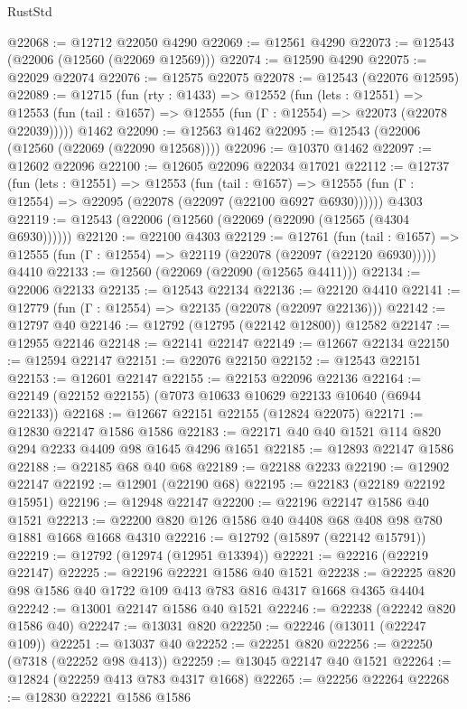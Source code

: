 \begin{lexlean}{RustStd}
\begin{coremodule}
@22068 := @12712 @22050 @4290
@22069 := @12561 @4290
@22073 := @12543 (@22006 (@12560 (@22069 @12569)))
@22074 := @12590 @4290
@22075 := @22029 @22074
@22076 := @12575 @22075
@22078 := @12543 (@22076 @12595)
@22089 := @12715
    (fun (rty : @1433) =>
    @12552
      (fun (lets : @12551) =>
      @12553 (fun (tail : @1657) => @12555 (fun (Γ : @12554) => @22073 (@22078 @22039)))))
    @1462
@22090 := @12563 @1462
@22095 := @12543 (@22006 (@12560 (@22069 (@22090 @12568))))
@22096 := @10370 @1462
@22097 := @12602 @22096
@22100 := @12605 @22096 @22034 @17021
@22112 := @12737
    (fun (lets : @12551) =>
    @12553
      (fun (tail : @1657) =>
      @12555 (fun (Γ : @12554) => @22095 (@22078 (@22097 (@22100 @6927 @6930))))))
    @4303
@22119 := @12543 (@22006 (@12560 (@22069 (@22090 (@12565 (@4304 @6930))))))
@22120 := @22100 @4303
@22129 := @12761
    (fun (tail : @1657) => @12555 (fun (Γ : @12554) => @22119 (@22078 (@22097 (@22120 @6930)))))
    @4410
@22133 := @12560 (@22069 (@22090 (@12565 @4411)))
@22134 := @22006 @22133
@22135 := @12543 @22134
@22136 := @22120 @4410
@22141 := @12779 (fun (Γ : @12554) => @22135 (@22078 (@22097 @22136)))
@22142 := @12797 @40
@22146 := @12792 (@12795 (@22142 @12800)) @12582
@22147 := @12955 @22146
@22148 := @22141 @22147
@22149 := @12667 @22134
@22150 := @12594 @22147
@22151 := @22076 @22150
@22152 := @12543 @22151
@22153 := @12601 @22147
@22155 := @22153 @22096 @22136
@22164 := @22149 (@22152 @22155) (@7073 @10633 @10629 @22133 @10640 (@6944 @22133))
@22168 := @12667 @22151 @22155 (@12824 @22075)
@22171 := @12830 @22147 @1586 @1586
@22183 := @22171 @40 @40 @1521 @114 @820 @294 @2233 @4409 @98 @1645 @4296 @1651
@22185 := @12893 @22147 @1586
@22188 := @22185 @68 @40 @68
@22189 := @22188 @2233
@22190 := @12902 @22147
@22192 := @12901 (@22190 @68)
@22195 := @22183 (@22189 @22192 @15951)
@22196 := @12948 @22147
@22200 := @22196 @22147 @1586 @40 @1521
@22213 := @22200 @820 @126 @1586 @40 @4408 @68 @408 @98 @780 @1881 @1668 @1668 @4310
@22216 := @12792 (@15897 (@22142 @15791))
@22219 := @12792 (@12974 (@12951 @13394))
@22221 := @22216 (@22219 @22147)
@22225 := @22196 @22221 @1586 @40 @1521
@22238 := @22225 @820 @98 @1586 @40 @1722 @109 @413 @783 @816 @4317 @1668 @4365 @4404
@22242 := @13001 @22147 @1586 @40 @1521
@22246 := @22238 (@22242 @820 @1586 @40)
@22247 := @13031 @820
@22250 := @22246 (@13011 (@22247 @109))
@22251 := @13037 @40
@22252 := @22251 @820
@22256 := @22250 (@7318 (@22252 @98 @413))
@22259 := @13045 @22147 @40 @1521
@22264 := @12824 (@22259 @413 @783 @4317 @1668)
@22265 := @22256 @22264
@22268 := @12830 @22221 @1586 @1586

\end{coremodule}
\end{lexlean}
